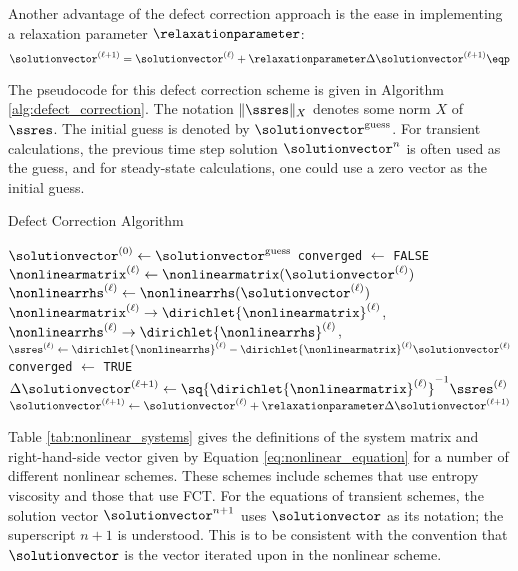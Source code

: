 Another advantage of the defect correction approach is the ease in implementing
a relaxation parameter $\relaxationparameter$:
\begin{equation}
  \solutionvector^{(\ell+1)} = \solutionvector^{(\ell)}
    + \relaxationparameter\Delta\solutionvector^{(\ell+1)} \eqp
\end{equation}

The pseudocode for this defect correction scheme is given in Algorithm
\ref{alg:defect_correction}.
The notation $\|\ssres\|_X$ denotes some norm $X$ of $\ssres$.
The initial guess is denoted by $\solutionvector^{\text{guess}}$. For
transient calculations, the previous time step solution $\solutionvector^n$
is often used as the guess, and for steady-state calculations, one
could use a zero vector as the initial guess.

\begin{algorithm}[H]
\caption{Defect Correction Algorithm}
\label{alg:defect_correction}
\begin{algorithmic}
\State $\solutionvector^{(0)} \gets \solutionvector^{\text{guess}}$
\State \texttt{converged} $\gets$ \texttt{FALSE}
  \State $\nonlinearmatrix^{(\ell)} \gets
    \nonlinearmatrix(\solutionvector^{(\ell)})$
  \State $\nonlinearrhs^{(\ell)} \gets
    \nonlinearrhs(\solutionvector^{(\ell)})$
  \State $\nonlinearmatrix^{(\ell)} \rightarrow \dirichlet{\nonlinearmatrix}^{(\ell)}$,
    $\nonlinearrhs^{(\ell)} \rightarrow \dirichlet{\nonlinearrhs}^{(\ell)}$,
  \State $\ssres^{(\ell)} \gets \dirichlet{\nonlinearrhs}^{(\ell)}
    - \dirichlet{\nonlinearmatrix}^{(\ell)}\solutionvector^{(\ell)}$
    \State \texttt{converged} $\gets$ \texttt{TRUE}
    \Break
  \EndIf
  \State $\Delta\solutionvector^{(\ell+1)}
    \gets \sq{\dirichlet{\nonlinearmatrix}^{(\ell)}}^{-1}\ssres^{(\ell)}$
  \State $\solutionvector^{(\ell+1)} \gets \solutionvector^{(\ell)}
    + \relaxationparameter\Delta\solutionvector^{(\ell+1)}$
\EndFor
{}
\EndIf
\end{algorithmic}
\end{algorithm}

Table \ref{tab:nonlinear_systems} gives the definitions of the system matrix
and right-hand-side vector given by Equation \eqref{eq:nonlinear_equation}
for a number of different nonlinear schemes. These schemes include schemes
that use entropy viscosity and those that use FCT. For the equations of
transient schemes, the solution vector $\solutionvector^{n+1}$ uses
$\solutionvector$ as its notation; the superscript $n+1$ is understood.
This is to be consistent
with the convention that $\solutionvector$ is the vector iterated upon in
the nonlinear scheme.

